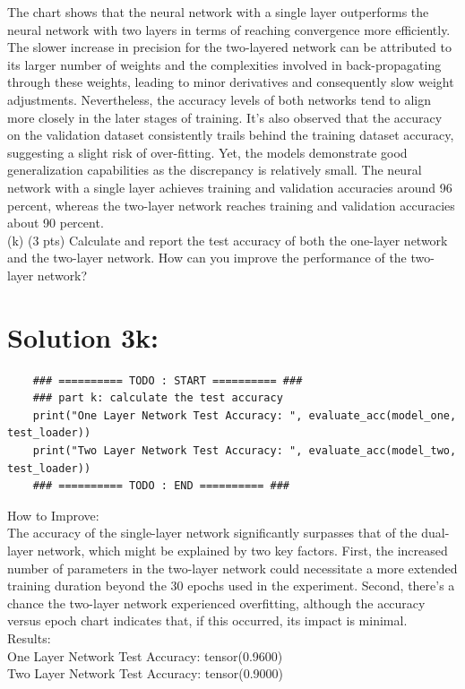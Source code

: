 \documentclass[10pt]{article}
\begin{document}
The chart shows that the neural network with a single layer outperforms the neural network with two layers in terms of reaching convergence more efficiently. The slower increase in precision for the two-layered network can be attributed to its larger number of weights and the complexities involved in back-propagating through these weights, leading to minor derivatives and consequently slow weight adjustments. Nevertheless, the accuracy levels of both networks tend to align more closely in the later stages of training. It's also observed that the accuracy on the validation dataset consistently trails behind the training dataset accuracy, suggesting a slight risk of over-fitting. Yet, the models demonstrate good generalization capabilities as the discrepancy is relatively small. The neural network with a single layer achieves training and validation accuracies around 96 percent, whereas the two-layer network reaches training and validation accuracies about 90 percent. \\

(k) (3 pts) Calculate and report the test accuracy of both the one-layer network and the two-layer network. How can you improve the performance of the two-layer network?

\section*{Solution 3k:}

\begin{verbatim}
    ### ========== TODO : START ========== ###
    ### part k: calculate the test accuracy
    print("One Layer Network Test Accuracy: ", evaluate_acc(model_one, test_loader))
    print("Two Layer Network Test Accuracy: ", evaluate_acc(model_two, test_loader))
    ### ========== TODO : END ========== ###
\end{verbatim}

How to Improve: \\
The accuracy of the single-layer network significantly surpasses that of the dual-layer network, which might be explained by two key factors. First, the increased number of parameters in the two-layer network could necessitate a more extended training duration beyond the 30 epochs used in the experiment. Second, there's a chance the two-layer network experienced overfitting, although the accuracy versus epoch chart indicates that, if this occurred, its impact is minimal. \\


Results: \\
One Layer Network Test Accuracy:  tensor(0.9600) \\
Two Layer Network Test Accuracy:  tensor(0.9000) \\
\end{document}
